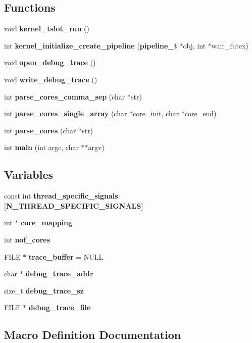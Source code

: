 \subsection*{Functions}
\begin{DoxyCompactItemize}
\item 
void {\bf kernel\-\_\-tslot\-\_\-run} ()
\item 
int {\bf kernel\-\_\-initialize\-\_\-create\-\_\-pipeline} ({\bf pipeline\-\_\-t} $\ast$obj, int $\ast$wait\-\_\-futex)
\item 
void {\bf open\-\_\-debug\-\_\-trace} ()
\item 
void {\bf write\-\_\-debug\-\_\-trace} ()
\item 
int {\bf parse\-\_\-cores\-\_\-comma\-\_\-sep} (char $\ast$str)
\item 
int {\bf parse\-\_\-cores\-\_\-single\-\_\-array} (char $\ast$core\-\_\-init, char $\ast$core\-\_\-end)
\item 
int {\bf parse\-\_\-cores} (char $\ast$str)
\item 
int {\bf main} (int argc, char $\ast$$\ast$argv)
\end{DoxyCompactItemize}
\subsection*{Variables}
\begin{DoxyCompactItemize}
\item 
const int {\bf thread\-\_\-specific\-\_\-signals} [{\bf N\-\_\-\-T\-H\-R\-E\-A\-D\-\_\-\-S\-P\-E\-C\-I\-F\-I\-C\-\_\-\-S\-I\-G\-N\-A\-L\-S}]
\item 
int $\ast$ {\bf core\-\_\-mapping}
\item 
int {\bf nof\-\_\-cores}
\item 
F\-I\-L\-E $\ast$ {\bf trace\-\_\-buffer} = N\-U\-L\-L
\item 
char $\ast$ {\bf debug\-\_\-trace\-\_\-addr}
\item 
size\-\_\-t {\bf debug\-\_\-trace\-\_\-sz}
\item 
F\-I\-L\-E $\ast$ {\bf debug\-\_\-trace\-\_\-file}
\end{DoxyCompactItemize}


\subsection{Macro Definition Documentation}
